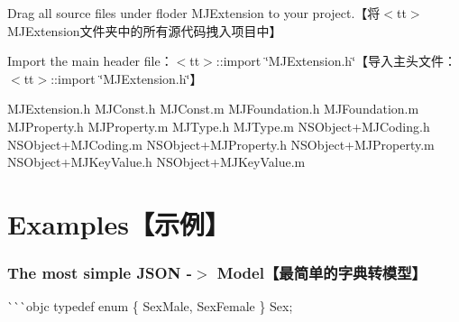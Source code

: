 \begin{DoxyItemize}
\item Drag all source files under floder {\ttfamily M\+J\+Extension} to your project.\+【将$<$tt$>$M\+J\+Extension文件夹中的所有源代码拽入项目中】
\item Import the main header file：$<$tt$>$\+::import \char`\"{}\+M\+J\+Extension.\+h\char`\"{}【导入主头文件：$<$tt$>$\+::import \char`\"{}\+M\+J\+Extension.\+h\char`\"{}】
\end{DoxyItemize}


\begin{DoxyCode}
MJExtension.h
MJConst.h               MJConst.m
MJFoundation.h          MJFoundation.m
MJProperty.h            MJProperty.m
MJType.h                MJType.m
NSObject+MJCoding.h     NSObject+MJCoding.m
NSObject+MJProperty.h   NSObject+MJProperty.m
NSObject+MJKeyValue.h   NSObject+MJKeyValue.m
\end{DoxyCode}


\section*{Examples【示例】}

\subsubsection*{The most simple J\+S\+ON -\/$>$ Model【最简单的字典转模型】}

\`{}\`{}\`{}objc typedef enum \{ Sex\+Male, Sex\+Female \} Sex; 